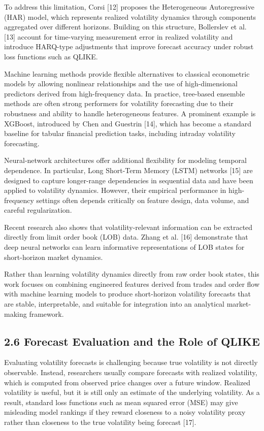\documentclass[12pt,a4paper]{article}
\begin{document}
To address this limitation, Corsi {[}12{]} proposes the Heterogeneous
Autoregressive (HAR) model, which represents realized volatility
dynamics through components aggregated over different horizons. Building
on this structure, Bollerslev et al. {[}13{]} account for time-varying
measurement error in realized volatility and introduce HARQ-type
adjustments that improve forecast accuracy under robust loss functions
such as QLIKE.

Machine learning methods provide flexible alternatives to classical
econometric models by allowing nonlinear relationships and the use of
high-dimensional predictors derived from high-frequency data. In
practice, tree-based ensemble methods are often strong performers for
volatility forecasting due to their robustness and ability to handle
heterogeneous features. A prominent example is XGBoost, introduced by
Chen and Guestrin {[}14{]}, which has become a standard baseline for
tabular financial prediction tasks, including intraday volatility
forecasting.

Neural-network architectures offer additional flexibility for modeling
temporal dependence. In particular, Long Short-Term Memory (LSTM)
networks {[}15{]} are designed to capture longer-range dependencies in
sequential data and have been applied to volatility dynamics. However,
their empirical performance in high-frequency settings often depends
critically on feature design, data volume, and careful regularization.

Recent research also shows that volatility-relevant information can be
extracted directly from limit order book (LOB) data. Zhang et al.
{[}16{]} demonstrate that deep neural networks can learn informative
representations of LOB states for short-horizon market dynamics.

Rather than learning volatility dynamics directly from raw order book
states, this work focuses on combining engineered features derived from
trades and order flow with machine learning models to produce
short-horizon volatility forecasts that are stable, interpretable, and
suitable for integration into an analytical market-making framework.

\subsection{2.6 Forecast Evaluation and the Role of
QLIKE}\label{forecast-evaluation-and-the-role-of-qlike}

Evaluating volatility forecasts is challenging because true volatility
is not directly observable. Instead, researchers usually compare
forecasts with realized volatility, which is computed from observed
price changes over a future window. Realized volatility is useful, but
it is still only an estimate of the underlying volatility. As a result,
standard loss functions such as mean squared error (MSE) may give
misleading model rankings if they reward closeness to a noisy volatility
proxy rather than closeness to the true volatility being forecast
{[}17{]}.
\end{document}
